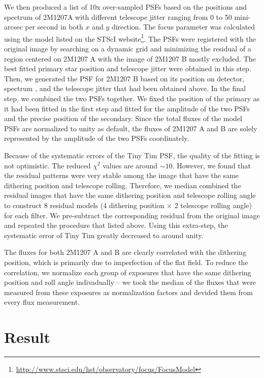 \documentclass[apj]{emulateapj}
\begin{document}
We then produced a list of 10x over-sampled PSFs based on the
positions and spectrum \citep{Bonnefoy2014} of 2M1207A with different telescope jitter
ranging from 0 to 50 mini-arcsec per second in both $x$ and $y$
direction. The focus parameter was calculated using the model listed
on the STScI
website\footnote{\url{http://www.stsci.edu/hst/observatory/focus/FocusModel}}. The
PSFs were registered with the original image by searching on a dynamic
grid and minimizing the residual of a region centered on 2M1207 A with
the image of 2M1207 B mostly excluded. The best fitted primary star
position and telescope jitter were obtained in this step. Then, we
generated the PSF for 2M1207 B based on its position on detector,
spectrum \citep{Patience2010}, and the telescope jitter that had been obtained above. In
the final step, we combined the two PSFs together. We fixed the
position of the primary as it had been fitted in the first step and
fitted for the amplitude of the two PSFs and the precise position of
the secondary. Since the total fluxes of the model PSFs are normalized
to unity as default, the fluxes of 2M1207 A and B are solely
represented by the amplitude of the two PSFs coordinately.

Because of the systematic errors of the Tiny Tim PSF, the quality of the
fitting is not optimistic. The reduced $\chi^{2}$ values are around
$\sim10$. However, we found that the residual patterns were very
stable among the image that have the same dithering position and
telescope rolling. Therefore, we median combined the residual images
that have the same dithering position and telescope rolling angle to
construct 8 residual models (4 dithering position $\times$ 2 telescope
rolling angle) for each filter. We pre-subtract the corresponding
residual from the original image and repeated the procedure that
listed above. Using this extra-step, the systematic error of Tiny Tim
greatly decreased to around unity.

The fluxes for both 2M1207 A and B are clearly correlated with the
dithering position, which is primarily due to imperfection of the flat
field. To reduce the correlation, we normalize each group of exposures
that have the same dithering position and roll angle indivadually --
we took the median of the fluxes that were measured from these
exposures as normalization factors and devided them from every flux
measurement. 


\section{Result}
\end{document}
